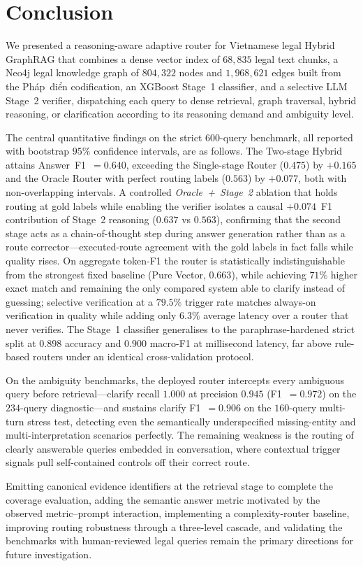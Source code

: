 \section{Conclusion}\label{sec:conclusion}

We presented a reasoning-aware adaptive router for Vietnamese legal Hybrid
GraphRAG that combines a dense vector index of $68{,}835$ legal text chunks, a
Neo4j legal knowledge graph of $804{,}322$ nodes and $1{,}968{,}621$ edges
built from the Pháp~điển codification, an XGBoost Stage~1 classifier, and a
selective LLM Stage~2 verifier, dispatching each query to dense retrieval,
graph traversal, hybrid reasoning, or clarification according to its reasoning
demand and ambiguity level.

The central quantitative findings on the strict $600$-query benchmark, all
reported with bootstrap $95\%$ confidence intervals, are as follows. The
Two-stage Hybrid attains Answer~F1~$=0.640$, exceeding the Single-stage
Router ($0.475$) by $+0.165$ and the Oracle Router with perfect routing
labels ($0.563$) by $+0.077$, both with non-overlapping intervals. A
controlled \textit{Oracle~+~Stage~2} ablation that holds routing at gold
labels while enabling the verifier isolates a causal $+0.074$~F1 contribution
of Stage~2 reasoning ($0.637$ vs $0.563$), confirming that the second stage
acts as a chain-of-thought step during answer generation rather than as a
route corrector---executed-route agreement with the gold labels in fact falls
while quality rises. On aggregate token-F1 the router is statistically
indistinguishable from the strongest fixed baseline (Pure Vector, $0.663$),
while achieving $71\%$ higher exact match and remaining the only compared
system able to clarify instead of guessing; selective verification at a
$79.5\%$ trigger rate matches always-on verification in quality while adding
only $6.3\%$ average latency over a router that never verifies. The Stage~1
classifier generalises to the paraphrase-hardened strict split at $0.898$
accuracy and $0.900$ macro-F1 at millisecond latency, far above rule-based
routers under an identical cross-validation protocol.

On the ambiguity benchmarks, the deployed router intercepts every ambiguous
query before retrieval---clarify recall $1.000$ at precision $0.945$
(F1~$=0.972$) on the $234$-query diagnostic---and sustains clarify
F1~$=0.906$ on the $160$-query multi-turn stress test, detecting even the
semantically underspecified missing-entity and multi-interpretation scenarios
perfectly. The remaining weakness is the routing of clearly answerable
queries embedded in conversation, where contextual trigger signals pull
self-contained controls off their correct route.

Emitting canonical evidence identifiers at the retrieval stage to complete
the coverage evaluation, adding the semantic answer metric motivated by the
observed metric--prompt interaction, implementing a complexity-router
baseline, improving routing robustness through a three-level cascade, and
validating the benchmarks with human-reviewed legal queries remain the
primary directions for future investigation.